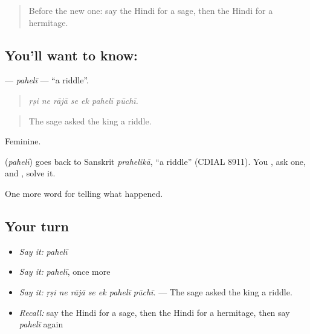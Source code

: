 \begin{quote}
Before the new one: say the Hindi for a sage, then the Hindi for a hermitage.
\end{quote}

\subsection*{You'll want to know: }
\textbf{} — \emph{pahelī} — \textquotedblleft{}a riddle\textquotedblright{}.

\begin{quote}
      
\end{quote}

\begin{quote}
\emph{ṛṣi ne rājā se ek pahelī pūchī.}
\end{quote}

\begin{quote}
The sage asked the king a riddle.
\end{quote}

Feminine.

\begin{cousinweb}
\textbf{} (\emph{pahelī}) goes back to Sanskrit \emph{prahelikā}, \textquotedblleft{}a riddle\textquotedblright{} (CDIAL 8911). You \textbf{ }, ask one, and \textbf{ }, solve it.
\end{cousinweb}

\begin{grammarlens}[title={What you've built}]
One more word for telling what happened.
\end{grammarlens}

\subsection*{Your turn}
\begin{itemize}
\raggedright
  \item \emph{Say it:} \emph{pahelī}
  \item \emph{Say it:} \emph{pahelī}, once more
  \item \emph{Say it:} \emph{ṛṣi ne rājā se ek pahelī pūchī.} — The sage asked the king a riddle.
  \item \emph{Recall:} say the Hindi for a sage, then the Hindi for a hermitage, then say \emph{pahelī} again
\end{itemize}

